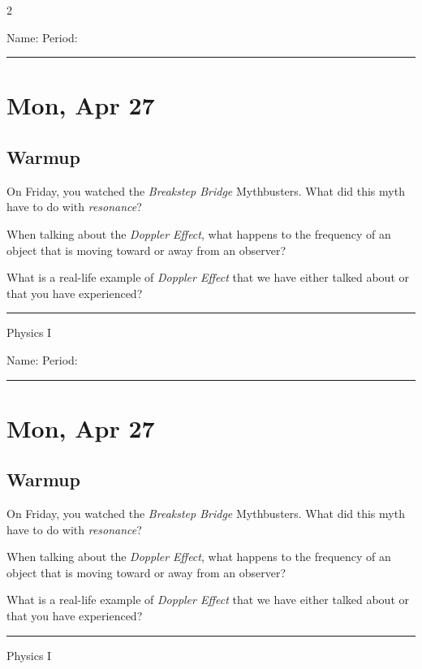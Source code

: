 \documentclass[10pt,landscape]{exam}
\def\todayDate{Mon, Apr 27}
\def\content{

\begin{questions}
  \question On Friday, you watched the \emph{Breakstep Bridge} Mythbusters.  What did this myth have to do with \emph{resonance}? \vs

  \question When talking about the \emph{Doppler Effect}, what happens to the frequency of an object that is moving toward or away from an observer? \vs 

  \question What is a real-life example of \emph{Doppler Effect} that we have either talked about or that you have experienced? \vs 
\end{questions}

}
\begin{document}
\pagestyle{empty}

\setlength{\columnsep}{0.8in}
\begin{multicols*}{2}

\noindent  
Name: \hfill Period: \hspace{5em}
\vspace{0.5em}
\hrule

\section*{\todayDate}
\subsection*{Warmup}

\content

\vfill
\hrule
\vspace{0.5em}
\hfill {\sc Physics I}

\columnbreak

\noindent  
Name: \hfill Period: \hspace{5em}
\vspace{0.5em}
\hrule

\section*{\todayDate}
\subsection*{Warmup}

\content

\vfill
\hrule
\vspace{0.5em}
\hfill {\sc Physics I}

\end{multicols*}
\end{document}
